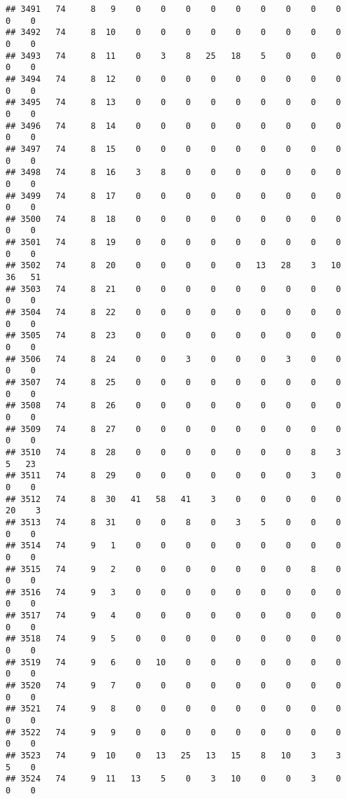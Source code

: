 \documentclass[]{article}
\begin{document}
\begin{verbatim}
## 3491   74     8   9    0    0    0    0    0    0    0    0    0    0    0
## 3492   74     8  10    0    0    0    0    0    0    0    0    0    0    0
## 3493   74     8  11    0    3    8   25   18    5    0    0    0    0    0
## 3494   74     8  12    0    0    0    0    0    0    0    0    0    0    0
## 3495   74     8  13    0    0    0    0    0    0    0    0    0    0    0
## 3496   74     8  14    0    0    0    0    0    0    0    0    0    0    0
## 3497   74     8  15    0    0    0    0    0    0    0    0    0    0    0
## 3498   74     8  16    3    8    0    0    0    0    0    0    0    0    0
## 3499   74     8  17    0    0    0    0    0    0    0    0    0    0    0
## 3500   74     8  18    0    0    0    0    0    0    0    0    0    0    0
## 3501   74     8  19    0    0    0    0    0    0    0    0    0    0    0
## 3502   74     8  20    0    0    0    0    0   13   28    3   10   36   51
## 3503   74     8  21    0    0    0    0    0    0    0    0    0    0    0
## 3504   74     8  22    0    0    0    0    0    0    0    0    0    0    0
## 3505   74     8  23    0    0    0    0    0    0    0    0    0    0    0
## 3506   74     8  24    0    0    3    0    0    0    3    0    0    0    0
## 3507   74     8  25    0    0    0    0    0    0    0    0    0    0    0
## 3508   74     8  26    0    0    0    0    0    0    0    0    0    0    0
## 3509   74     8  27    0    0    0    0    0    0    0    0    0    0    0
## 3510   74     8  28    0    0    0    0    0    0    0    8    3    5   23
## 3511   74     8  29    0    0    0    0    0    0    0    3    0    0    0
## 3512   74     8  30   41   58   41    3    0    0    0    0    0   20    3
## 3513   74     8  31    0    0    8    0    3    5    0    0    0    0    0
## 3514   74     9   1    0    0    0    0    0    0    0    0    0    0    0
## 3515   74     9   2    0    0    0    0    0    0    0    8    0    0    0
## 3516   74     9   3    0    0    0    0    0    0    0    0    0    0    0
## 3517   74     9   4    0    0    0    0    0    0    0    0    0    0    0
## 3518   74     9   5    0    0    0    0    0    0    0    0    0    0    0
## 3519   74     9   6    0   10    0    0    0    0    0    0    0    0    0
## 3520   74     9   7    0    0    0    0    0    0    0    0    0    0    0
## 3521   74     9   8    0    0    0    0    0    0    0    0    0    0    0
## 3522   74     9   9    0    0    0    0    0    0    0    0    0    0    0
## 3523   74     9  10    0   13   25   13   15    8   10    3    3    5    0
## 3524   74     9  11   13    5    0    3   10    0    0    3    0    0    0

\end{verbatim}
\end{document}
